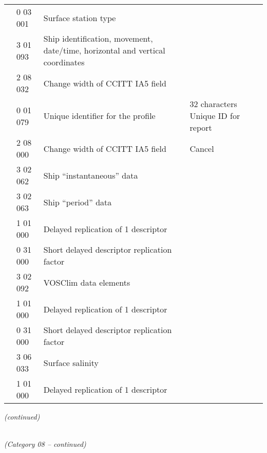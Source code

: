 \begin{longtable}[]{@{}llll@{}}
& 0 03 001 & Surface station type &\tabularnewline
& 3 01 093 & Ship identification, movement, date/time, horizontal and vertical coordinates &\tabularnewline
& 2 08 032 & Change width of CCITT IA5 field &\tabularnewline
& 0 01 079 & Unique identifier for the profile & 32 characters \textbf{\textbar{}} Unique ID for report\tabularnewline
& 2 08 000 & Change width of CCITT IA5 field & Cancel\tabularnewline
& 3 02 062 & Ship ``instantaneous'' data &\tabularnewline
& 3 02 063 & Ship ``period'' data &\tabularnewline
& 1 01 000 & Delayed replication of 1 descriptor &\tabularnewline
& 0 31 000 & Short delayed descriptor replication factor &\tabularnewline
& 3 02 092 & VOSClim data elements &\tabularnewline
& 1 01 000 & Delayed replication of 1 descriptor &\tabularnewline
& 0 31 000 & Short delayed descriptor replication factor &\tabularnewline
& 3 06 033 & Surface salinity &\tabularnewline
& 1 01 000 & Delayed replication of 1 descriptor &\tabularnewline
\bottomrule
\end{longtable}

\emph{(continued)}

\emph{\\
(Category 08 -- continued)}

